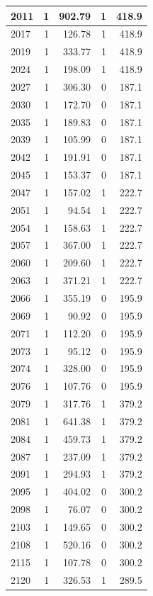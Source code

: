\documentclass[
  12pt,
]{book}
\begin{document}
\begin{tabular}{l|r|r|r|r}
\hline
2011 & 1 & 902.79 & 1 & 418.9\\
\hline
2017 & 1 & 126.78 & 1 & 418.9\\
\hline
2019 & 1 & 333.77 & 1 & 418.9\\
\hline
2024 & 1 & 198.09 & 1 & 418.9\\
\hline
2027 & 1 & 306.30 & 0 & 187.1\\
\hline
2030 & 1 & 172.70 & 0 & 187.1\\
\hline
2035 & 1 & 189.83 & 0 & 187.1\\
\hline
2039 & 1 & 105.99 & 0 & 187.1\\
\hline
2042 & 1 & 191.91 & 0 & 187.1\\
\hline
2045 & 1 & 153.37 & 0 & 187.1\\
\hline
2047 & 1 & 157.02 & 1 & 222.7\\
\hline
2051 & 1 & 94.54 & 1 & 222.7\\
\hline
2054 & 1 & 158.63 & 1 & 222.7\\
\hline
2057 & 1 & 367.00 & 1 & 222.7\\
\hline
2060 & 1 & 209.60 & 1 & 222.7\\
\hline
2063 & 1 & 371.21 & 1 & 222.7\\
\hline
2066 & 1 & 355.19 & 0 & 195.9\\
\hline
2069 & 1 & 90.92 & 0 & 195.9\\
\hline
2071 & 1 & 112.20 & 0 & 195.9\\
\hline
2073 & 1 & 95.12 & 0 & 195.9\\
\hline
2074 & 1 & 328.00 & 0 & 195.9\\
\hline
2076 & 1 & 107.76 & 0 & 195.9\\
\hline
2079 & 1 & 317.76 & 1 & 379.2\\
\hline
2081 & 1 & 641.38 & 1 & 379.2\\
\hline
2084 & 1 & 459.73 & 1 & 379.2\\
\hline
2087 & 1 & 237.09 & 1 & 379.2\\
\hline
2091 & 1 & 294.93 & 1 & 379.2\\
\hline
2095 & 1 & 404.02 & 0 & 300.2\\
\hline
2098 & 1 & 76.07 & 0 & 300.2\\
\hline
2103 & 1 & 149.65 & 0 & 300.2\\
\hline
2108 & 1 & 520.16 & 0 & 300.2\\
\hline
2115 & 1 & 107.78 & 0 & 300.2\\
\hline
2120 & 1 & 326.53 & 1 & 289.5\\

\end{tabular}
\end{document}
